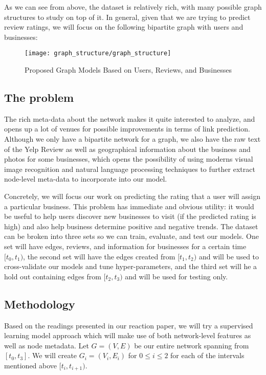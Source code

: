 \documentclass[letterpaper, 11 pt, conference]{ieeeconf}  %
\begin{document}
As we can see from above, the dataset is relatively rich, with many possible graph structures to study on top of it. In general, given that we are trying to predict review ratings, we will focus on the following bipartite graph with users and businesses:

\begin{figure}
\centering
\texttt{[image: graph\_structure/graph\_structure]}
\caption{Proposed Graph Models Based on Users, Reviews, and Businesses}
\label{fig:graph_structure}
\end{figure}

\subsection{The problem}
The rich meta-data about the network makes it quite interested to analyze, and opens up a lot of venues for possible improvements in terms of link prediction. Although we only have a bipartite network for a graph, we also have the raw text of the Yelp Review as well as geographical information about the business and photos for some businesses, which opens the possibility of using moderns visual image recognition and natural language processing techniques to further extract node-level meta-data to incorporate into our model.

Concretely, we will focus our work on predicting the rating that a user will assign a particular business. This problem has immediate and obvious utility: it would be useful to help users discover new businesses to visit (if the predicted rating is high) and also help business determine positive and negative trends. The dataset can be broken into three sets so we can train, evaluate, and test our models. One set will have edges, reviews, and information for businesses for a certain time $[t_0, t_1)$, the second set will have the edges created from $[t_1, t_2)$ and will be used to cross-validate our models and tune hyper-parameters, and the third set will he a hold out containing edges from $[t_2, t_3)$ and will be used for testing only.

\subsection{Methodology}
Based on the readings presented in our reaction paper, we will try a supervised learning model approach which will make use of both network-level features as well as node metadata. Let $G = (V,E)$ be our entire network spanning from $[t_0, t_3]$. We will create $G_i = (V_i, E_i)$ for $0 \leq i \leq 2$ for each of the intervals mentioned above $[t_i, t_{i+1})$.
\end{document}
